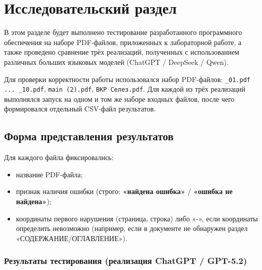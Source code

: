 \chapter{Исследовательский раздел}

В этом разделе будет выполнено тестирование разработанного программного обеспечения на наборе PDF-файлов,
приложенных к лабораторной работе, а также проведено сравнение трёх реализаций, полученных с использованием
различных больших языковых моделей (ChatGPT / DeepSeek / Qwen).

Для проверки корректности работы использовался набор PDF-файлов:
\texttt{\_01.pdf ... \_10.pdf}, \texttt{main (2).pdf}, \texttt{ВКР Селез.pdf}.
Для каждой из трёх реализаций выполнялся запуск на одном и том же наборе входных файлов, после чего
формировался отдельный CSV-файл результатов.

\section{Форма представления результатов}

Для каждого файла фиксировались:
\begin{itemize}
  \item название PDF-файла;
  \item признак наличия ошибки (строго: \textbf{«найдена ошибка»} / \textbf{«ошибка не найдена»});
  \item координаты первого нарушения (страница, строка) либо «-», если координаты определить невозможно
  (например, если в документе не обнаружен раздел «СОДЕРЖАНИЕ/ОГЛАВЛЕНИЕ»).
\end{itemize}

\subsection{Результаты тестирования (реализация ChatGPT / GPT-5.2)}

